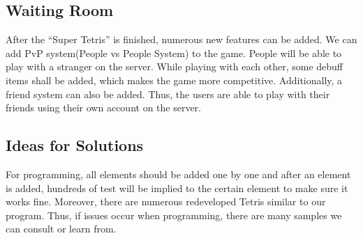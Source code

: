 \documentclass[12pt, titlepage]{article}
\begin{document}
\subsection{Waiting Room}
\tab After the “Super Tetris” is finished, numerous new features can be added. We can add PvP system(People vs People System) to the game. People will be able to play with a stranger on the server. While playing with each other, some debuff items shall be added, which makes the game more competitive. Additionally, a friend system can also be added.  Thus, the users are able to play with their friends using their own account on the server.
\subsection{Ideas for Solutions}
\tab For programming, all elements should be added one by one and after an element is added, hundreds of test will be implied to the certain element to make sure it works fine. Moreover, there are numerous redeveloped Tetris similar to our program. Thus, if issues occur when programming, there are many samples we can consult or learn from.
\end{document}
